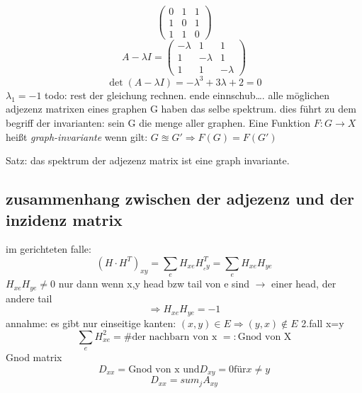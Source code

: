 \documentclass[a4paper]{article}
\theoremstyle{definition}
\theoremstyle{remark}
\begin{document}
\begin{equation}
  \begin{pmatrix}
  0&1&1\\1&0&1\\1&1&0
  \end{pmatrix}
\end{equation}
\begin{equation}
  A-\lambda I= \begin{pmatrix}
  -\lambda &1&1\\1&-\lambda &1\\1&1&-\lambda 
  \end{pmatrix}
\end{equation}
\begin{equation}
  \det(A-\lambda I)= -\lambda ^3+3\lambda +2=0
\end{equation}
$\lambda_1=-1
$ todo: rest der gleichung rechnen.
ende einnschub\ldots.
alle möglichen adjezenz matrixen eines graphen G haben das selbe spektrum. dies führt zu dem begriff der invarianten:
sein G die menge aller graphen. Eine Funktion $F: G\rightarrow X$ heißt \textit{graph-invariante} wenn gilt: $G\approxeq G' \Rightarrow F(G)=F(G')$

Satz: das spektrum der adjezenz matrix ist eine graph invariante.\\
\subsection{zusammenhang zwischen der adjezenz und der inzidenz matrix}
\label{sub:zusammenhang_zwischen_der_adjezenz_und_der_inzidenz_matrix}

im gerichteten falle:\\
\begin{equation}
  (H\cdot H^{T})_{xy}= \sum_{e} H_{xe}H^{T}_{_ey}= \sum_e H_{xe}H_{ye}
\end{equation}
$H_{xe}H_{ye}\neq 0$ nur dann wenn x,y head bzw tail von e sind $\rightarrow $ einer head, der andere tail 
\begin{equation}
  \Rightarrow H_{xe}H_{ye}=-1
\end{equation}
annahme: es gibt nur einseitige kanten: $(x,y)\in E \Rightarrow (y,x) \notin E$
2.fall x=y\\
\begin{equation}
  \sum_e H_{xe}^2= \textrm{\# der nachbarn von x } =: \textrm{Gnod von X}
\end{equation}
Gnod matrix  
\begin{equation}
  D_{xx}= \textrm{Gnod von x und} D_{xy}=0 \textrm{für} x\neq y
\end{equation}
\begin{equation}
  D_{xx}= sum_j A_{xy}
\end{equation}
\end{document}
